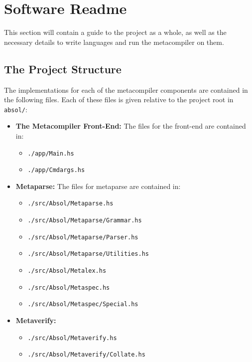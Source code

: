 \chapter{Software Readme} %
\label{cha:software_readme}
This section will contain a guide to the project as a whole, as well as the necessary details to write languages and run the metacompiler on them.

\section{The Project Structure} %
\label{sec:the_project_structure}
The implementations for each of the metacompiler components are contained in the following files. 
Each of these files is given relative to the project root in \texttt{absol/}:
\begin{itemize}
    \item \textbf{The Metacompiler Front-End:} The files for the front-end are contained in:
    \begin{itemize}
        \item \texttt{./app/Main.hs}
        \item \texttt{./app/Cmdargs.hs}
    \end{itemize}
    \item \textbf{Metaparse:} The files for metaparse are contained in:
    \begin{itemize}
        \item \texttt{./src/Absol/Metaparse.hs}
        \item \texttt{./src/Absol/Metaparse/Grammar.hs}
        \item \texttt{./src/Absol/Metaparse/Parser.hs}
        \item \texttt{./src/Absol/Metaparse/Utilities.hs}
        \item \texttt{./src/Absol/Metalex.hs}
        \item \texttt{./src/Absol/Metaspec.hs}
        \item \texttt{./src/Absol/Metaspec/Special.hs}
    \end{itemize}
    \item \textbf{Metaverify:} 
    \begin{itemize}
        \item \texttt{./src/Absol/Metaverify.hs}
        \item \texttt{./src/Absol/Metaverify/Collate.hs}

\end{itemize}
\end{itemize}
